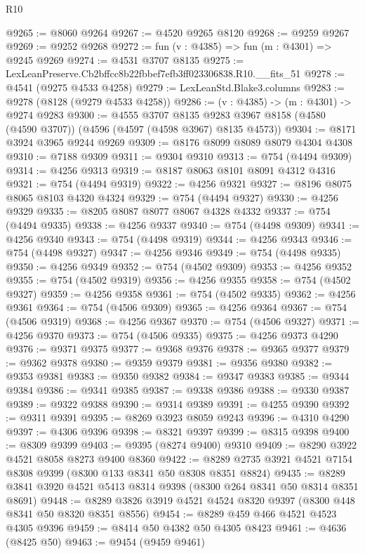 \begin{lexlean}{R10}
\begin{coremodule}
@9265 := @8060 @9264
@9267 := @4520 @9265 @8120
@9268 := @9259 @9267
@9269 := @9252 @9268
@9272 := fun (v : @4385) => fun (m : @4301) => @9245 @9269
@9274 := @4531 @3707 @8135
@9275 := LexLeanPreserve.Cb2bffcc8b22fbbef7efb3ff023306838.R10.__fits_51
@9278 := @4541 (@9275 @4533 @4258)
@9279 := LexLeanStd.Blake3.columns
@9283 := @9278 (@8128 (@9279 @4533 @4258))
@9286 := (v : @4385) -> (m : @4301) -> @9274 @9283
@9300 := @4555
    @3707
    @8135
    @9283
    @3967
    @8158
    (@4580 (@4590 @3707))
    (@4596 (@4597 (@4598 @3967) @8135 @4573))
@9304 := @8171 @3924 @3965 @9244 @9269
@9309 := @8176 @8099 @8089 @8079 @4304 @4308
@9310 := @7188 @9309
@9311 := @9304 @9310
@9313 := @754 (@4494 @9309)
@9314 := @4256 @9313
@9319 := @8187 @8063 @8101 @8091 @4312 @4316
@9321 := @754 (@4494 @9319)
@9322 := @4256 @9321
@9327 := @8196 @8075 @8065 @8103 @4320 @4324
@9329 := @754 (@4494 @9327)
@9330 := @4256 @9329
@9335 := @8205 @8087 @8077 @8067 @4328 @4332
@9337 := @754 (@4494 @9335)
@9338 := @4256 @9337
@9340 := @754 (@4498 @9309)
@9341 := @4256 @9340
@9343 := @754 (@4498 @9319)
@9344 := @4256 @9343
@9346 := @754 (@4498 @9327)
@9347 := @4256 @9346
@9349 := @754 (@4498 @9335)
@9350 := @4256 @9349
@9352 := @754 (@4502 @9309)
@9353 := @4256 @9352
@9355 := @754 (@4502 @9319)
@9356 := @4256 @9355
@9358 := @754 (@4502 @9327)
@9359 := @4256 @9358
@9361 := @754 (@4502 @9335)
@9362 := @4256 @9361
@9364 := @754 (@4506 @9309)
@9365 := @4256 @9364
@9367 := @754 (@4506 @9319)
@9368 := @4256 @9367
@9370 := @754 (@4506 @9327)
@9371 := @4256 @9370
@9373 := @754 (@4506 @9335)
@9375 := @4256 @9373 @4290
@9376 := @9371 @9375
@9377 := @9368 @9376
@9378 := @9365 @9377
@9379 := @9362 @9378
@9380 := @9359 @9379
@9381 := @9356 @9380
@9382 := @9353 @9381
@9383 := @9350 @9382
@9384 := @9347 @9383
@9385 := @9344 @9384
@9386 := @9341 @9385
@9387 := @9338 @9386
@9388 := @9330 @9387
@9389 := @9322 @9388
@9390 := @9314 @9389
@9391 := @4255 @9390
@9392 := @9311 @9391
@9395 := @8269 @3923 @8059 @9243
@9396 := @4310 @4290
@9397 := @4306 @9396
@9398 := @8321 @9397
@9399 := @8315 @9398
@9400 := @8309 @9399
@9403 := @9395 (@8274 @9400) @9310
@9409 := @8290 @3922 @4521 @8058 @8273 @9400 @8360
@9422 := @8289 @2735 @3921 @4521 @7154 @8308 @9399 (@8300 @133 @8341 @50 @8308 @8351 @8824)
@9435 := @8289 @3841 @3920 @4521 @5413 @8314 @9398 (@8300 @264 @8341 @50 @8314 @8351 @8691)
@9448 := @8289 @3826 @3919 @4521 @4524 @8320 @9397 (@8300 @448 @8341 @50 @8320 @8351 @8556)
@9454 := @8289 @459 @466 @4521 @4523 @4305 @9396
@9459 := @8414 @50 @4382 @50 @4305 @8423
@9461 := @4636 (@8425 @50)
@9463 := @9454 (@9459 @9461)

\end{coremodule}
\end{lexlean}
